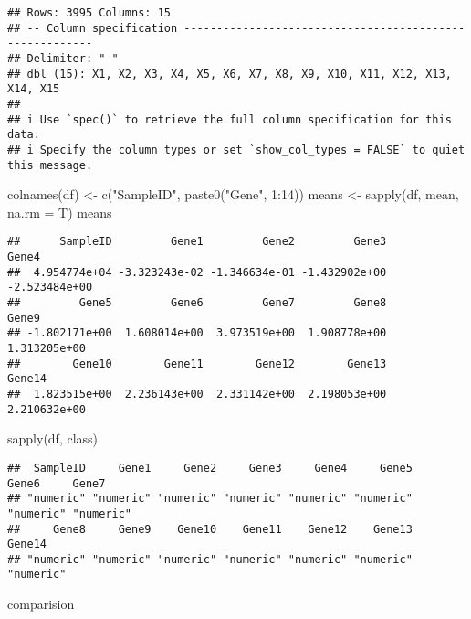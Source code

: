 \documentclass[
]{article}
\newenvironment{Shaded}{\begin{snugshade}}{\end{snugshade}}
\newcommand{\AttributeTok}[1]{\textcolor[rgb]{0.77,0.63,0.00}{#1}}
\newcommand{\DecValTok}[1]{\textcolor[rgb]{0.00,0.00,0.81}{#1}}
\newcommand{\FunctionTok}[1]{\textcolor[rgb]{0.00,0.00,0.00}{#1}}
\newcommand{\NormalTok}[1]{#1}
\newcommand{\OtherTok}[1]{\textcolor[rgb]{0.56,0.35,0.01}{#1}}
\newcommand{\SpecialCharTok}[1]{\textcolor[rgb]{0.00,0.00,0.00}{#1}}
\newcommand{\StringTok}[1]{\textcolor[rgb]{0.31,0.60,0.02}{#1}}
\begin{document}
\begin{verbatim}
## Rows: 3995 Columns: 15
## -- Column specification --------------------------------------------------------
## Delimiter: " "
## dbl (15): X1, X2, X3, X4, X5, X6, X7, X8, X9, X10, X11, X12, X13, X14, X15
## 
## i Use `spec()` to retrieve the full column specification for this data.
## i Specify the column types or set `show_col_types = FALSE` to quiet this message.
\end{verbatim}

\begin{Shaded}
\begin{Highlighting}[]
\FunctionTok{colnames}\NormalTok{(df) }\OtherTok{\textless{}{-}} \FunctionTok{c}\NormalTok{(}\StringTok{"SampleID"}\NormalTok{, }\FunctionTok{paste0}\NormalTok{(}\StringTok{"Gene"}\NormalTok{, }\DecValTok{1}\SpecialCharTok{:}\DecValTok{14}\NormalTok{))}
\NormalTok{means }\OtherTok{\textless{}{-}} \FunctionTok{sapply}\NormalTok{(df, mean, }\AttributeTok{na.rm =}\NormalTok{ T)}
\NormalTok{means}
\end{Highlighting}
\end{Shaded}

\begin{verbatim}
##      SampleID         Gene1         Gene2         Gene3         Gene4 
##  4.954774e+04 -3.323243e-02 -1.346634e-01 -1.432902e+00 -2.523484e+00 
##         Gene5         Gene6         Gene7         Gene8         Gene9 
## -1.802171e+00  1.608014e+00  3.973519e+00  1.908778e+00  1.313205e+00 
##        Gene10        Gene11        Gene12        Gene13        Gene14 
##  1.823515e+00  2.236143e+00  2.331142e+00  2.198053e+00  2.210632e+00
\end{verbatim}

\begin{Shaded}
\begin{Highlighting}[]
\FunctionTok{sapply}\NormalTok{(df, class)}
\end{Highlighting}
\end{Shaded}

\begin{verbatim}
##  SampleID     Gene1     Gene2     Gene3     Gene4     Gene5     Gene6     Gene7 
## "numeric" "numeric" "numeric" "numeric" "numeric" "numeric" "numeric" "numeric" 
##     Gene8     Gene9    Gene10    Gene11    Gene12    Gene13    Gene14 
## "numeric" "numeric" "numeric" "numeric" "numeric" "numeric" "numeric"
\end{verbatim}

comparision
\end{document}
